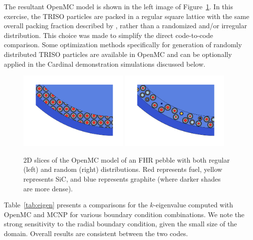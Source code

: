 The resultant OpenMC model is shown in the left image of Figure~\ref{f:openmc_pebble}.  In this exercise, the TRISO particles are packed in a regular square lattice with the same overall packing fraction described by \cite{phillips2010}, rather than a randomized and/or irregular distribution.  This choice was made to simplify the direct code-to-code comparison. Some optimization methods specifically for generation of randomly distributed TRISO particles are available in OpenMC \cite{openmcdocs_triso} and can be optionally applied in the Cardinal demonstration simulations discussed below.

\begin{figure}[!h]
\centering
\includegraphics[clip=true,width=0.48\textwidth]{Figures/pebble_yz_cropped_regular.png}
\includegraphics[clip=true,width=0.48\textwidth]{Figures/pebble_yz_cropped_random.png}
\caption{2D slices of the OpenMC model of an FHR pebble with both regular (left) and random (right) distributions.  Red represents fuel, yellow represents
SiC, and blue represents graphite (where darker shades are more dense).}
\label{f:openmc_pebble}
\end{figure}

Table~\ref{tab:eigen} presents a comparisons for the $k$-eigenvalue computed with OpenMC and MCNP for various boundary condition combinations. We note the strong sensitivity to the radial boundary condition, given the small size of the domain. Overall results are consistent between the two codes.

